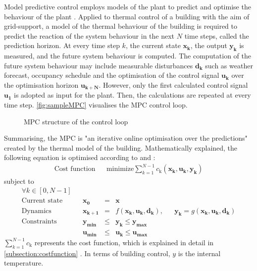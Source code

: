 Model predictive control employs models of the plant to predict and optimise the behaviour of the plant \cite{Grune.2017}.
Applied to thermal control of a building with the aim of grid-support, a model of the thermal behaviour of the building is required to predict the reaction of the system behaviour in the next $N$ time steps, called the prediction horizon. At every time step $k$, the current state $\mathbf{x_k}$, the output $\mathbf{y_k}$ is measured, and the future system behaviour is computed. The computation of the future system behaviour may include measurable disturbances $\mathbf{d_k}$  such as weather forecast, occupancy schedule and the optimisation of the control signal $\mathbf{u_k}$ over the optimisation horizon $\mathbf{u_{k+N}}$. However, only the first calculated control signal $\mathbf{u_1}$ is adopted as input for the plant.
Then, the calculations are repeated at every time step. \autoref{fig:sampleMPC} visualises the MPC control loop.
 \begin{figure}[h]
    \centering
   \def\svgwidth{320pt}
    
    \caption{MPC structure of the control loop}
    \label{fig:sampleMPC}
    \end{figure}
\newline
Summarising, the MPC is "an iterative online optimisation over the predictions"
\cite{Grune.2017} 
created by the thermal model of the building. Mathematically explained, the following equation is optimised according to
\cite{Kouvaritakis.2018}
and
\cite{Oldewurtel.2012}:
\begin{align}
\label{eq:costfunc}
\textrm{Cost function} && \text{minimize} \sum_{k=1}^{N-1} c_\text{k}(\mathbf{x_k,u_k,y_k})
\end{align}
subject to 
\begin{align*}
\forall k \in [0,N-1]\\
\textrm{Current state} && \mathbf{x_0} &=& \mathbf{x} \\	
\textrm{Dynamics} && \mathbf{x_{k+1}}&=& f(\mathbf{x_k,u_k,d_k}),		&&	\mathbf{y_k} = g(\mathbf{x_k,u_k,d_k})\\				
\textrm{Constraints} && \mathbf{y_{min}}&\leq& \mathbf{y_k} \leq \mathbf{y_{max}}\\		
\textrm{} && \mathbf{u_{min}}&\leq& \mathbf{u_k} \leq \mathbf{u_{max}}	
\end{align*}
$\sum_{k=1}^{N-1} c_\text{k}$ represents the cost function, which is explained in detail in \autoref{subsection:costfunction}
. In terms of building control, $y$ is the internal temperature.

